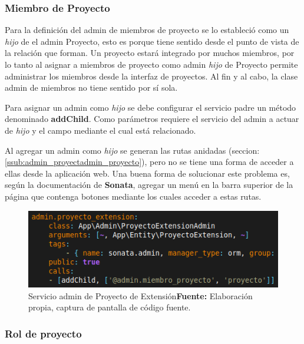 \documentclass{article}
\begin{document}
\subsubsection{Miembro de Proyecto}%
\label{ssub:miembro_de_proyecto_admin}
Para la definición del admin de miembros de proyecto se lo estableció como un \textit{hijo} de el admin Proyecto, esto es porque tiene sentido desde el punto de vista
de la relación que forman. Un proyecto estará integrado por muchos miembros, por lo tanto al asignar a miembros de proyecto como admin \textit{hijo} de Proyecto permite
administrar los miembros desde la interfaz de proyectos. Al fin y al cabo, la clase admin de miembros no tiene sentido por sí sola.

Para asignar un admin como \textit{hijo} se debe configurar el servicio padre un método denominado \textbf{addChild}. Como parámetros requiere el servicio del admin
a actuar de \textit{hijo} y el campo mediante el cual está relacionado.


Al agregar un admin como \textit{hijo} se generan las rutas anidadas (seccion: \ref{ssub:admin_proyectadmin_proyecto}), pero no se tiene una forma de acceder a
ellas desde la aplicación web\@. Una buena forma de solucionar este problema es, según la documentación de \textbf{Sonata}, agregar un menú en la barra superior
de la página que contenga botones mediante los cuales acceder a estas rutas.\textcite{sonata-childAdmin}

\begin{figure}[h]
    \includegraphics[width=1\linewidth]{image/addChild.png}
    \caption{Servicio admin de Proyecto de Extensión\newline \textbf{Fuente:} Elaboración propia, captura de pantalla de código fuente.}
    \label{fig:image/addChild}
\end{figure}

\newpage
\subsubsection{Rol de proyecto}%
\label{ssub:rol_de_proyecto_admin}
\end{document}
